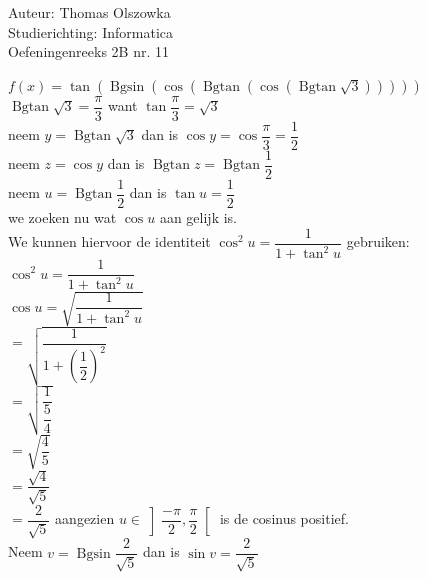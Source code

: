 \documentclass[a4paper]{article}
\newcommand{\Bgsin}{\operatorname{Bgsin}}
\newcommand{\Bgtan}{\operatorname{Bgtan}}
\begin{document}
\noindent \large Auteur: Thomas Olszowka \\
\noindent \large Studierichting: Informatica \\
\noindent \large Oefeningenreeks 2B nr. 11 \\



\medskip

\normalsize

$f(x) = \tan\left(\Bgsin\left(\cos\left(\Bgtan\left(\cos\left(\Bgtan\sqrt{3}\right)\right)\right)\right)\right)$ \\

$\Bgtan \sqrt{3} = \dfrac{\pi}{3}$ want $\tan \dfrac{\pi}{3} = \sqrt{3}$ \\

neem $ y = \Bgtan \sqrt{3}$ dan is $\cos y = \cos \dfrac{\pi}{3} = \dfrac{1}{2}$ \\

neem $z = \cos y$ dan is $\Bgtan z = \Bgtan \dfrac{1}{2}$ \\

neem $u = \Bgtan \dfrac{1}{2}$ dan is $\tan u = \dfrac{1}{2}$ \\

we zoeken nu wat $\cos u$ aan gelijk is. \\ 

We kunnen hiervoor de identiteit $\cos^2u = \dfrac{1}{1 + \tan^2 u}$ gebruiken: \\

$\cos^2u = \dfrac{1}{1 + \tan^2 u}$ \\

$\cos u = \sqrt{\dfrac{1}{1 + \tan^2 u}}$ \\

$= \sqrt{\dfrac{1}{1 + \left( \dfrac{1}{2}\right)^2}}$ \\

$= \sqrt{\dfrac{1}{\dfrac{5}{4}}}$ \\

$= \sqrt{\dfrac{4}{5}}$ \\

$= \dfrac{\sqrt{4}}{\sqrt{5}}$ \\

$= \dfrac{2}{\sqrt{5}}$ aangezien $u \in \left]\dfrac{-\pi}{2}, \dfrac{\pi}{2} \right[$ is de cosinus positief. \\

Neem $v = \Bgsin \dfrac{2}{\sqrt{5}}$ dan is $\sin v = \dfrac{2}{\sqrt{5}}$ \\
\end{document}
